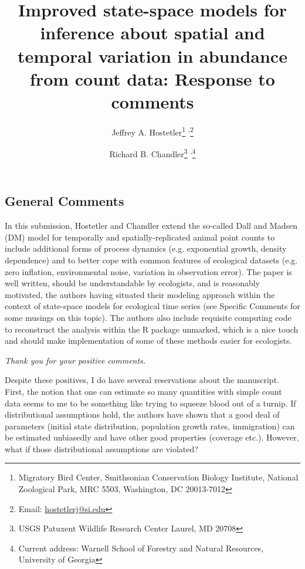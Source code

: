 \documentclass[12pt,english]{article}
\title{Improved state-space models for inference about 
spatial and temporal variation in abundance from count data: Response to comments}
\author{Jeffrey A. Hostetler\thanks{Migratory Bird Center, Smithsonian 
Conservation Biology Institute, National Zoological Park, MRC 5503, 
Washington, DC 20013-7012} \textsuperscript{,}\footnote{Email: \href{mailto:hostetlerj@si.edu}{hostetlerj@si.edu}}
   \and Richard B. Chandler\footnote{USGS Patuxent Wildlife Research Center 
        Laurel, MD 20708} \textsuperscript{,}\thanks{Current address: Warnell School of
     Forestry and Natural Resources, University of Georgia}        
}
\date{} %
\begin{document}
\maketitle
\vspace{-1cm}
\begin{spacing}{1.9}
\begin{flushleft}
\renewcommand*\thetable{R\arabic{table}}
\renewcommand*\thefigure{R\arabic{figure}}
\renewcommand*\theequation{R\arabic{equation}}

\section*{General Comments}
\label{sec:general}

In this submission, Hostetler and Chandler extend the so-called Dall and Madsen (DM) 
model for temporally and spatially-replicated animal point counts to include additional 
forms of process dynamics (e.g. exponential growth, density dependence) and to better 
cope with common features of ecological datasets (e.g. zero inflation, environmental noise, 
variation in observation error). The paper is well written, should be understandable by ecologists, 
and is reasonably motivated, the authors having situated their modeling approach within the 
context of state-space models for ecological time series (see Specific Comments for some 
musings on this topic). The authors also include requisite computing code to reconstruct the 
analysis within the R package unmarked, which is a nice touch and should make implementation 
of some of these methods easier for ecologists.

\textit{Thank you for your positive comments.}

Despite these positives, I do have several reservations about the manuscript. First, the notion that 
one can estimate so many quantities with simple count data seems to me to be something like trying 
to squeeze blood out of a turnip. If distributional assumptions hold, the authors have shown that a 
good deal of parameters (initial state distribution, population growth rates, immigration) can be 
estimated unbiasedly and have other good properties (coverage etc.). However, what if those 
distributional assumptions are violated?


\end{flushleft}
\end{spacing}
\end{document}
